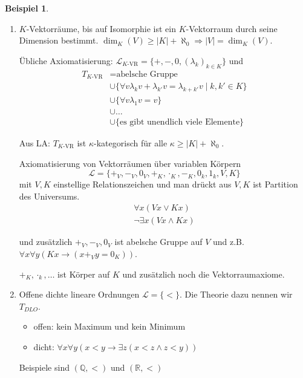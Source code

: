 \documentclass[12pt,parskip=full]{scrartcl}
\newcommand{\setQ}{\mathbb{Q}}
\newcommand{\setR}{\mathbb{R}}
\newcommand{\abs}[1]{{\left| #1 \right|}}
\theoremstyle{definition}
\newtheorem{example}[theorem]{Beispiel}
\begin{document}
	\begin{example}
		\begin{enumerate}
			\item $K$-Vektorräume, bis auf Isomorphie ist ein $K$-Vektorraum durch seine Dimension bestimmt. $\dim_K(V) \geq \abs{K} + \aleph_0 \Rightarrow \abs{V} = \dim_K(V)$.
			
			Übliche Axiomatisierung: $\mathcal{L}_\text{$K$-VR}= \{ +, -, 0, (\lambda_k)_{k \in K} \}$ und
			\begin{align*}
				T_\text{$K$-VR} &= \text{abelsche Gruppe} \\
				& \cup \{ \forall v \lambda_k v + \lambda_{k'} v = \lambda_{k+k'} v \mid k, k' \in K \} \\
				& \cup \{ \forall v \lambda_1 v = v \} \\
				& \cup \dots \\
				& \cup \{ \text{es gibt unendlich viele Elemente} \}
			\end{align*}
			
			Aus LA: $T_\text{$K$-VR}$ ist $\kappa$-kategorisch für alle $\kappa \geq \abs{K} + \aleph_0$.
			
			Axiomatisierung von Vektorräumen über variablen Körpern
			\begin{equation*}
				\mathcal{L} = \{ +_V, -_V, 0_V, +_K, \cdot_K, -_K, 0_k, 1_k, V, K \}
			\end{equation*}
			mit $V,K$ einstellige Relationszeichen und man drückt aus $V,K$ ist Partition des Universums.
			\begin{align*}
				\forall x ( V x \lor K x) \\
				\lnot \exists x (V x \land K x)
			\end{align*}
			
			und zusätzlich $+_V, -_V, 0_V$ ist abelsche Gruppe auf $V$ und z.B. $\forall x \forall y (K x \rightarrow (x +_V y = 0_K))$.
			
			$+_K, \cdot_k, \dots$ ist Körper auf $K$ und zusätzlich noch die Vektorraumaxiome.
			
			\item Offene dichte lineare Ordnungen $\mathcal{L} = \{ < \}$. Die Theorie dazu nennen wir $T_{DLO}$.
			\begin{itemize}
				\item offen: kein Maximum und kein Minimum
				\item dicht: $\forall x \forall y ( x < y \rightarrow \exists z (x < z \land z < y))$
			\end{itemize}
			Beispiele sind $(\setQ, <)$ und $(\setR, <)$
			

\end{enumerate}
\end{example}
\end{document}
